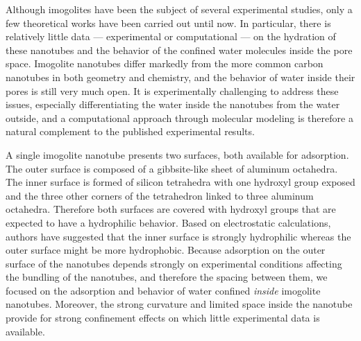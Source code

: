 \documentclass[thesis]{subfiles}
\begin{document}
Although imogolites have been the subject of several experimental studies, only
a few theoretical works have been carried out until now. In particular, there is
relatively little data --- experimental or computational --- on the hydration of
these nanotubes and the behavior of the confined water molecules inside the pore
space. Imogolite nanotubes differ markedly from the more common carbon nanotubes
in both geometry and chemistry, and the behavior of water inside their pores is
still very much open. It is experimentally challenging to address these issues,
especially differentiating the water inside the nanotubes from the water
outside, and a computational approach through molecular modeling is therefore a
natural complement to the published experimental results.

A single imogolite nanotube presents two surfaces, both available for
adsorption. The outer surface is composed of a gibbsite-like sheet of aluminum
octahedra. The inner surface is formed of silicon tetrahedra with one hydroxyl
group exposed and the three other corners of the tetrahedron linked to three
aluminum octahedra. Therefore both surfaces are covered with hydroxyl groups
that are expected to have a hydrophilic behavior. Based on electrostatic
calculations, authors have suggested that the inner surface is strongly
hydrophilic whereas the outer surface might be more
hydrophobic\cite{Gustafsson2001,Guimaraes2007}. Because adsorption on the outer
surface of the nanotubes depends strongly on experimental conditions affecting
the bundling of the nanotubes, and therefore the spacing between them, we
focused on the adsorption and behavior of water confined \emph{inside} imogolite
nanotubes. Moreover, the strong curvature and limited space inside the nanotube
provide for strong confinement effects on which little experimental data is
available.
\end{document}
